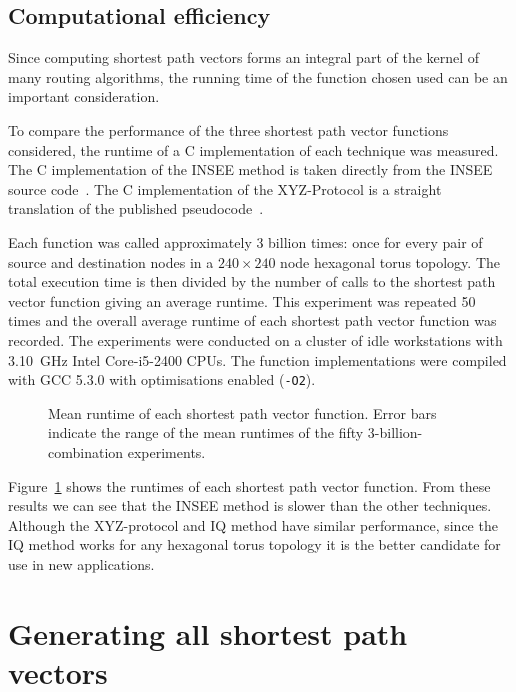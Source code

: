		\subsection{Computational efficiency}
			
			Since computing shortest path vectors forms an integral part of the
			kernel of many routing algorithms, the running time of the function
			chosen used can be an important consideration.
			
			To compare the performance of the three shortest path vector functions
			considered, the runtime of a C implementation of each technique was
			measured. The C implementation of the INSEE method is taken directly from
			the INSEE source code~\cite{navaridas09}. The C implementation of the
			XYZ-Protocol is a straight translation of the published
			pseudocode~\cite{hoffmann15}.
			
			Each function was called approximately 3 billion times: once for every
			pair of source and destination nodes in a $240\times240$ node hexagonal
			torus topology. The total execution time is then divided by the number of
			calls to the shortest path vector function giving an average runtime.
			This experiment was repeated 50 times and the overall average runtime of
			each shortest path vector function was recorded. The experiments were
			conducted on a cluster of idle workstations with 3.10~GHz Intel
			Core-i5-2400 CPUs. The function implementations were compiled with GCC
			5.3.0 with optimisations enabled (\verb|-O2|).
			
			\begin{figure}
				\center
				
				\caption[Mean runtime of each shortest path vector function.]%
				{Mean runtime of each shortest path vector function. Error bars
				indicate the range of the mean runtimes of the fifty
				3-billion-combination experiments.}
				\label{fig:shortest-path-vector-runtimes}
			\end{figure}
			
			Figure~\ref{fig:shortest-path-vector-runtimes} shows the runtimes of each
			shortest path vector function. From these results we can see that the
			INSEE method is slower than the other techniques. Although the
			XYZ-protocol and IQ method have similar performance, since the IQ method
			works for any hexagonal torus topology it is the better candidate for use
			in new applications.
	
	\section{Generating all shortest path vectors}
			
